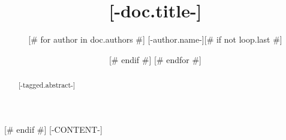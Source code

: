 \title{[-doc.title-]}
\author{[# for author in doc.authors #]
[-author.name-][# if not loop.last #] \and [# endif #]
[# endfor #]
}

\begin{abstract}
[-tagged.abstract-]
\end{abstract}
[# endif #]
[-CONTENT-]
